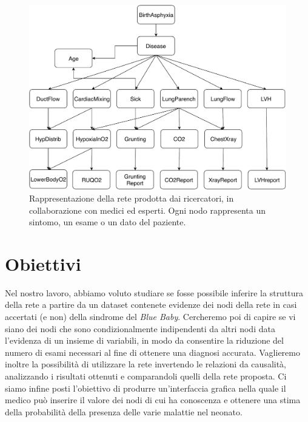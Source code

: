  \begin{figure}
 	\centering
 	\includegraphics[width=1\linewidth]{images/paper_structure}
 	\caption{Rappresentazione della rete prodotta dai ricercatori, in collaborazione con medici ed esperti. Ogni nodo rappresenta un sintomo, un esame o un dato del paziente.}
 	\label{fig:paperstructure}
 \end{figure}

\section{Obiettivi}
Nel nostro lavoro, abbiamo voluto studiare se fosse possibile inferire la struttura della rete a partire da un dataset contenete evidenze dei nodi della rete in casi accertati (e non) della sindrome del \textit{Blue Baby}. Cercheremo poi di capire se vi siano dei nodi che sono condizionalmente indipendenti da altri nodi data l'evidenza di un insieme di variabili, in modo da consentire la riduzione del numero di esami necessari al fine di ottenere una diagnosi accurata. Vaglieremo inoltre la possibilità di utilizzare la rete invertendo le relazioni da causalità, analizzando i risultati ottenuti e comparandoli quelli della rete proposta. Ci siamo infine posti l'obiettivo di produrre un'interfaccia grafica nella quale il medico può inserire il valore dei nodi di cui ha conoscenza e ottenere una stima della probabilità della presenza delle varie malattie nel neonato.